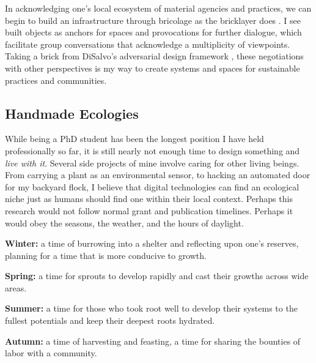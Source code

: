 In acknowledging one's local ecosystem of material agencies and practices, we can begin to build an infrastructure through bricolage as the bricklayer does \cite{turkle_epistemological_1990, vallgarda_interaction_2015}. I see built objects as anchors for spaces and provocations for further dialogue, which facilitate group conversations that acknowledge a multiplicity of viewpoints. Taking a brick from DiSalvo's adversarial design framework \cite{disalvo_adversarial_2012}, these negotiations with other perspectives is my way to create systems and spaces for sustainable practices and communities.

\subsection{Handmade Ecologies}

While being a PhD student has been the longest position I have held professionally so far, it is still nearly not enough time to design something and \textit{live with it}. Several side projects of mine involve caring for other living beings. From carrying a plant as an environmental sensor, to hacking an automated door for my backyard flock, I believe that digital technologies can find an ecological niche just as humans should find one within their local context. Perhaps this research would not follow normal grant and publication timelines. Perhaps it would obey the seasons, the weather, and the hours of daylight. 

\textbf{Winter:} a time of burrowing into a shelter and reflecting upon one's reserves, planning for a time that is more conducive to growth.

\textbf{Spring:} a time for sprouts to develop rapidly and cast their growths across wide areas. 

\textbf{Summer:} a time for those who took root well to develop their systems to the fullest potentials and keep their deepest roots hydrated.

\textbf{Autumn:} a time of harvesting and feasting, a time for sharing the bounties of labor with a community.

